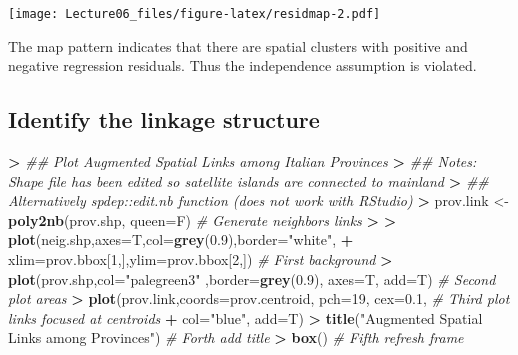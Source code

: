 \documentclass[
]{article}
\newenvironment{Shaded}{\begin{snugshade}}{\end{snugshade}}
\newcommand{\CommentTok}[1]{\textcolor[rgb]{0.56,0.35,0.01}{\textit{#1}}}
\newcommand{\DataTypeTok}[1]{\textcolor[rgb]{0.13,0.29,0.53}{#1}}
\newcommand{\DecValTok}[1]{\textcolor[rgb]{0.00,0.00,0.81}{#1}}
\newcommand{\ErrorTok}[1]{\textcolor[rgb]{0.64,0.00,0.00}{\textbf{#1}}}
\newcommand{\FloatTok}[1]{\textcolor[rgb]{0.00,0.00,0.81}{#1}}
\newcommand{\KeywordTok}[1]{\textcolor[rgb]{0.13,0.29,0.53}{\textbf{#1}}}
\newcommand{\NormalTok}[1]{#1}
\newcommand{\OperatorTok}[1]{\textcolor[rgb]{0.81,0.36,0.00}{\textbf{#1}}}
\newcommand{\StringTok}[1]{\textcolor[rgb]{0.31,0.60,0.02}{#1}}
\begin{document}
\texttt{[image: Lecture06\_files/figure-latex/residmap-2.pdf]}

The map pattern indicates that there are spatial clusters with positive
and negative regression residuals. Thus the independence assumption is
violated.

\hypertarget{identify-the-linkage-structure}{%
\subsection{Identify the linkage
structure}\label{identify-the-linkage-structure}}

\begin{Shaded}
\begin{Highlighting}[]
\OperatorTok{>}\StringTok{ }\CommentTok{## Plot Augmented Spatial Links among Italian Provinces}
\ErrorTok{>}\StringTok{ }\CommentTok{## Notes: Shape file has been edited so satellite islands are connected to mainland}
\ErrorTok{>}\StringTok{ }\CommentTok{## Alternatively spdep::edit.nb function (does not work with RStudio)}
\ErrorTok{>}\StringTok{ }\NormalTok{prov.link <-}\StringTok{ }\KeywordTok{poly2nb}\NormalTok{(prov.shp, }\DataTypeTok{queen=}\NormalTok{F)                          }\CommentTok{# Generate neighbors links}
\OperatorTok{>}\StringTok{ }
\ErrorTok{>}\StringTok{ }\KeywordTok{plot}\NormalTok{(neig.shp,}\DataTypeTok{axes=}\NormalTok{T,}\DataTypeTok{col=}\KeywordTok{grey}\NormalTok{(}\FloatTok{0.9}\NormalTok{),}\DataTypeTok{border=}\StringTok{"white"}\NormalTok{,}
\OperatorTok{+}\StringTok{      }\DataTypeTok{xlim=}\NormalTok{prov.bbox[}\DecValTok{1}\NormalTok{,],}\DataTypeTok{ylim=}\NormalTok{prov.bbox[}\DecValTok{2}\NormalTok{,])                      }\CommentTok{# First background}
\OperatorTok{>}\StringTok{ }\KeywordTok{plot}\NormalTok{(prov.shp,}\DataTypeTok{col=}\StringTok{"palegreen3"}\NormalTok{ ,}\DataTypeTok{border=}\KeywordTok{grey}\NormalTok{(}\FloatTok{0.9}\NormalTok{), }\DataTypeTok{axes=}\NormalTok{T, }\DataTypeTok{add=}\NormalTok{T) }\CommentTok{# Second plot areas}
\OperatorTok{>}\StringTok{ }\KeywordTok{plot}\NormalTok{(prov.link,}\DataTypeTok{coords=}\NormalTok{prov.centroid, }\DataTypeTok{pch=}\DecValTok{19}\NormalTok{, }\DataTypeTok{cex=}\FloatTok{0.1}\NormalTok{,            }\CommentTok{# Third plot links focused at centroids}
\OperatorTok{+}\StringTok{      }\DataTypeTok{col=}\StringTok{"blue"}\NormalTok{, }\DataTypeTok{add=}\NormalTok{T)}
\OperatorTok{>}\StringTok{ }\KeywordTok{title}\NormalTok{(}\StringTok{"Augmented Spatial Links among Provinces"}\NormalTok{)                 }\CommentTok{# Forth add title}
\OperatorTok{>}\StringTok{ }\KeywordTok{box}\NormalTok{()                                                            }\CommentTok{# Fifth refresh frame}
\end{Highlighting}
\end{Shaded}
\end{document}

